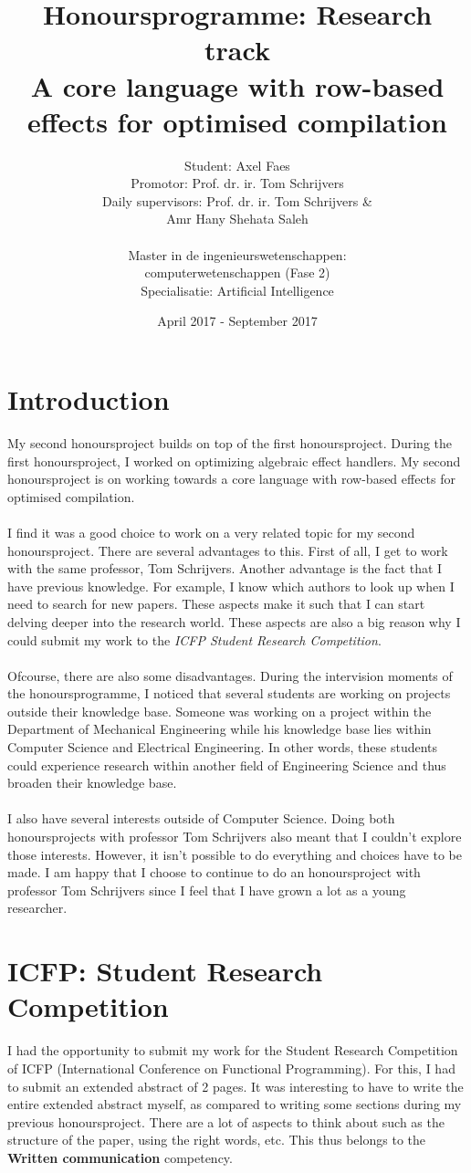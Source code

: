 \documentclass[notitlepage]{article}
\title{\vspace{-2cm}Honoursprogramme: Research track \\\mbox{}{A core language with row-based effects for optimised compilation}}
\author{Student: Axel Faes\\{ Promotor: Prof. dr. ir. Tom Schrijvers}\\{Daily supervisors:  Prof. dr. ir. Tom Schrijvers \&\\ Amr Hany Shehata Saleh}\\\mbox{}\\{Master in de ingenieurswetenschappen: \\computerwetenschappen (Fase 2)}\\{Specialisatie: Artificial Intelligence}}
\date{April 2017 - September 2017}
\begin{document}
\maketitle

\section{Introduction}
My second honoursproject builds on top of the first honoursproject. During the first honoursproject, I worked on optimizing algebraic effect handlers. My second honoursproject is on working towards a core language with row-based effects for optimised compilation. \\
\\
I find it was a good choice to work on a very related topic for my second honoursproject. There are several advantages to this. First of all, I get to work with the same professor, Tom Schrijvers. Another advantage is the fact that I have previous knowledge. For example, I know which authors to look up when I need to search for new papers. These aspects make it such that I can start delving deeper into the research world. These aspects are also a big reason why I could submit my work to the \textit{ICFP Student Research Competition}. \\
\\
Ofcourse, there are also some disadvantages. During the intervision moments of the honoursprogramme, I noticed that several students are working on projects outside their knowledge base. Someone was working on a project within the Department of Mechanical Engineering while his knowledge base lies within Computer Science and Electrical Engineering. In other words, these students could experience research within another field of Engineering Science and thus broaden their knowledge base. \\
\\
I also have several interests outside of Computer Science. Doing both honoursprojects with professor Tom Schrijvers also meant that I couldn't explore those interests. However, it isn't possible to do everything and choices have to be made. I am happy that I choose to continue to do an honoursproject with professor Tom Schrijvers since I feel that I have grown a lot as a young researcher.

\section{ICFP: Student Research Competition}
I had the opportunity to submit my work for the Student Research Competition of ICFP (International Conference on Functional Programming). For this, I had to submit an extended abstract of 2 pages. It was interesting to have to write the entire extended abstract myself, as compared to writing some sections during my previous honoursproject. There are a lot of aspects to think about such as the structure of the paper, using the right words, etc. This thus belongs to the \textbf{Written communication} competency.
\end{document}
